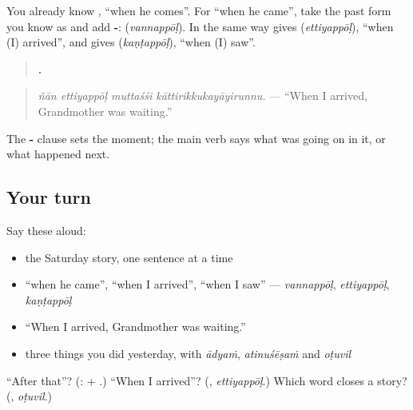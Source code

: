 \begin{grammarlens}[title={Grammar Lens: when it happened, -\ml{അപ്പോൾ}}]
You already know \textbf{}, \textquotedblleft{}when he comes\textquotedblright{}. For \textquotedblleft{}when he came\textquotedblright{}, take the past form you know as \textbf{} and add \textbf{-}: \textbf{} (\emph{vannappōḷ}). In the same way \textbf{} gives \textbf{} (\emph{ettiyappōḷ}), \textquotedblleft{}when (I) arrived\textquotedblright{}, and \textbf{} gives \textbf{} (\emph{kaṇṭappōḷ}), \textquotedblleft{}when (I) saw\textquotedblright{}.

\begin{quote}
\textbf{   .}
\end{quote}

\begin{quote}
\emph{ñān ettiyappōḷ muttaśśi kāttirikkukayāyirunnu.} — \textquotedblleft{}When I arrived, Grandmother was waiting.\textquotedblright{}
\end{quote}

The \textbf{-} clause sets the moment; the main verb says what was going on in it, or what happened next.
\end{grammarlens}

\subsection*{Your turn}
Say these aloud:

\begin{itemize}
\raggedright
  \item the Saturday story, one sentence at a time
  \item \textquotedblleft{}when he came\textquotedblright{}, \textquotedblleft{}when I arrived\textquotedblright{}, \textquotedblleft{}when I saw\textquotedblright{} — \emph{vannappōḷ}, \emph{ettiyappōḷ}, \emph{kaṇṭappōḷ}
  \item \textquotedblleft{}When I arrived, Grandmother was waiting.\textquotedblright{}
  \item three things you did yesterday, with \emph{ādyaṁ}, \emph{atinuśēṣaṁ} and \emph{oṭuvil}
\end{itemize}

\begin{tcolorbox}[breakable,colback=teal!4,colframe=teal!35!black,title={Before you move on}]
\textquotedblleft{}After that\textquotedblright{}? (\textbf{}: \textbf{} + \textbf{}.) \textquotedblleft{}When I arrived\textquotedblright{}? (\textbf{}, \emph{ettiyappōḷ}.) Which word closes a story? (\textbf{}, \emph{oṭuvil}.)
\end{tcolorbox}

